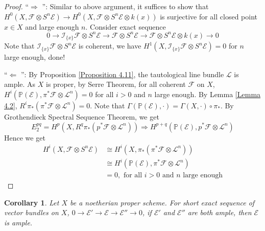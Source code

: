 \documentclass{ctexart}
\newtheorem{corollary}{Corollary}[section]
\newcommand{\leftquotes}{\textquotedblleft}
\newcommand{\rightquotes}{\textquotedblright}
\begin{document}
\begin{proof}
    \leftquotes $\Rightarrow$ \rightquotes : Similar to above argument, it suffices to show that $H^{0}(X, \mathcal{F} \otimes S^{n}\mathcal{E}) \rightarrow H^{0}(X, \mathcal{F} \otimes S^{n}\mathcal{E} \otimes k(x))$ is surjective for all closed point $x\in X$ and large enough $n$.
    Consider exact sequence
    \begin{equation}
        0 \rightarrow \mathcal{I}_{\{x\}}\mathcal{F} \otimes S^{n}\mathcal{E} \rightarrow \mathcal{F} \otimes S^{n}\mathcal{E} \rightarrow \mathcal{F} \otimes S^{n}\mathcal{E} \otimes k(x) \rightarrow 0
    \end{equation}
    Note that $\mathcal{I}_{\{x\}}\mathcal{F} \otimes S^{n}\mathcal{E}$ is coherent,
    we have $H^{1}(X, \mathcal{I}_{\{x\}}\mathcal{F} \otimes S^{n}\mathcal{E}) = 0$ for $n$ large enough, done!
    \par
    \leftquotes $\Leftarrow$ \rightquotes : By Proposition \ref{Proposition 4.11}, the tautological line bundle $\mathcal{L}$ is ample.
    As $X$ is proper, by Serre Theorem, for all coherent $\mathcal{F}$ on $X$,
    $H^{i}(\mathbb{P}(\mathcal{E}), \pi^{\ast}\mathcal{F} \otimes \mathcal{L}^{n}) = 0$ for all $i > 0$ and $n$ large enough.
    By Lemma \ref{Lemma 4.2}, $R^{i}\pi_{\ast}(\pi^{\ast}\mathcal{F} \otimes \mathcal{L}^{n}) = 0$.
    Note that $\Gamma(\mathbb{P}(\mathcal{E}), \cdot) = \Gamma(X, \cdot) \circ \pi_{\ast}$.
    By Grothendieck Spectral Sequence Theorem, we get
    \begin{equation}
        E_{2}^{pq} = H^{p}(X, R^{q}\pi_{\ast}(p^{\ast}\mathcal{F} \otimes \mathcal{L}^{n})) \Rightarrow H^{p + q}(\mathbb{P}(\mathcal{E}), p^{\ast}\mathcal{F} \otimes \mathcal{L}^{n})
    \end{equation}
    Hence we get
    \begin{equation}
        \begin{split}
            H^{i}(X, \mathcal{F} \otimes S^{n}\mathcal{E}) & \cong H^{i}(X, \pi_{\ast}(\pi^{\ast}\mathcal{F} \otimes \mathcal{L}^{n})) \\
            & \cong H^{i}(\mathbb{P}(\mathcal{E}), \pi^{\ast}\mathcal{F} \otimes \mathcal{L}^{n}) \\
            & = 0, \text{ for all $i > 0$ and $n$ large enough}
        \end{split}
    \end{equation}
\end{proof}
\begin{corollary}
    Let $X$ be a noetherian proper scheme.
    For short exact sequence of vector bundles on $X$, $0 \rightarrow \mathcal{E}' \rightarrow \mathcal{E} \rightarrow \mathcal{E}'' \rightarrow 0$,
    if $\mathcal{E}'$ and $\mathcal{E}''$ are both ample, then $\mathcal{E}$ is ample.
    \label{Corollary 4.7}
\end{corollary}
\end{document}
